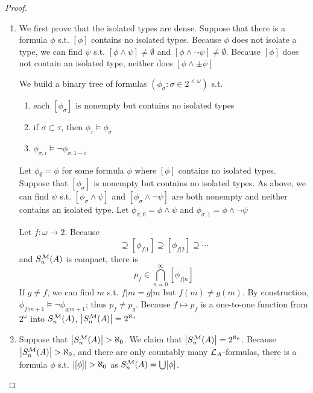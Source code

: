 \documentclass[11pt]{article}
\begin{document}
\begin{proof}
\begin{enumerate}
\item We first prove that the isolated types are dense. Suppose that there is a formula \(\phi\)
s.t. \([\phi]\) contains no isolated types. Because \(\phi\) does not isolate a type, we can find \(\psi\)
s.t. \([\phi\wedge\psi]\neq\emptyset\) and \([\phi\wedge\neg\psi]\neq\emptyset\). Because \([\phi]\) does not contain an isolated type, neither
does \([\phi\wedge\pm\psi]\)

We build a binary tree of formulas \((\phi_\sigma:\sigma\in 2^{<\omega})\) s.t.
\begin{enumerate}
\item each \([\phi_\sigma]\) is nonempty but contains no isolated types
\item if \(\sigma\subset\tau\), then \(\phi_\tau\vDash\phi_\sigma\)
\item \(\phi_{\sigma,i}\vDash\neg\phi_{\sigma,1-i}\)
\end{enumerate}
Let \(\phi_\emptyset=\phi\) for some formula \(\phi\) where \([\phi]\) contains no isolated types. Suppose
that \([\phi_\sigma]\) is nonempty but contains no isolated types. As above, we can find \(\psi\)
s.t. \([\phi_\sigma\wedge\psi]\) and \([\phi_\sigma\wedge\neg\psi]\) are both nonempty and neither contains an isolated type.
Let \(\phi_{\sigma,0}=\phi\wedge\psi\) and \(\phi_{\sigma,1}=\phi\wedge\neg\psi\)

Let \(f:\omega\to 2\). Because
\begin{equation*}
 [\phi_{f|0}]\supseteq[\phi_{f|1}]\supseteq[\phi_{f|2}]\supseteq\cdots
 \end{equation*}
and \(S_n^{\mathcal{M}}(A)\) is compact, there is
\begin{equation*}
 p_f\in\bigcap_{n=0}^\infty[\phi_{f|n}]
 \end{equation*}
If \(g\neq f\), we can find \(m\) s.t. \(f|m=g|m\) but \(f(m)\neq g(m)\). By
construction, \(\phi_{f|m+1}\vDash\neg\phi_{g|m+1}\); thus \(p_f\neq p_g\). Because \(f\mapsto p_f\) is a one-to-one
function from \(2^\omega\) into \(S_n^{\mathcal{M}}(A)\), \(\abs{S_n^{\calm}(A)}=2^{\aleph_0}\)
\item Suppose that \(\abs{S_n^{\calm}(A)}>\aleph_0\). We claim that \(\abs{S_n^{\calm}(A)}=2^{\aleph_0}\).
Because \(\abs{S_n^{\calm}(A)}>\aleph_0\), and there are only countably many \(\mathcal{L}_A\)-formulas, there
is a formula \(\phi\) s.t. \(\abs{[\phi]}>\aleph_0\) as \(S_n^{\mathcal{M}}(A)=\bigcup[\phi]\).


\end{enumerate}
\end{proof}
\end{document}
